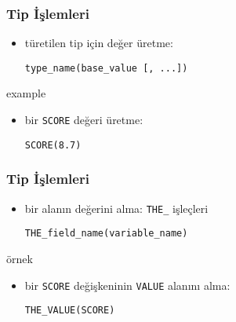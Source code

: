 \documentclass[dvipsnames]{beamer}
\theoremstyle{plain}
\begin{document}
\begin{frame}[fragile]
  \frametitle{Tip İşlemleri}
  
  \begin{itemize}
    \item türetilen tip için değer üretme:
    \begin{lstlisting}
type_name(base_value [, ...])
    \end{lstlisting}
  \end{itemize}

  \medskip
  \begin{exampleblock}{example}
    \begin{itemize}
      \item bir \texttt{SCORE} değeri üretme:
      \begin{lstlisting}
SCORE(8.7)
      \end{lstlisting}
    \end{itemize}
  \end{exampleblock}
\end{frame}

\begin{frame}[fragile]
  \frametitle{Tip İşlemleri}

  \begin{itemize}
    \item bir alanın değerini alma: \lstinline!THE_! işleçleri
    \begin{lstlisting}
THE_field_name(variable_name)
    \end{lstlisting}
  \end{itemize}

  \medskip
  \begin{exampleblock}{örnek}
    \begin{itemize}
      \item bir \texttt{SCORE} değişkeninin \texttt{VALUE} alanını alma:
      \begin{lstlisting}
THE_VALUE(SCORE)
      \end{lstlisting}
    \end{itemize}
  \end{exampleblock}
\end{frame}
\end{document}
